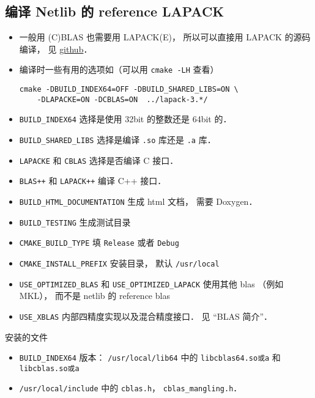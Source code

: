 \subsection{编译 Netlib 的 reference LAPACK}
\begin{itemize}
\item 一般用 (C)BLAS 也需要用 LAPACK(E)， 所以可以直接用 LAPACK 的源码编译， 见 \href{https://github.com/Reference-LAPACK/lapack/}{github}．
\item 编译时一些有用的选项如（可以用 \verb|cmake -LH| 查看）
\begin{lstlisting}[language=none]
cmake -DBUILD_INDEX64=OFF -DBUILD_SHARED_LIBS=ON \
    -DLAPACKE=ON -DCBLAS=ON  ../lapack-3.*/
\end{lstlisting}
\item \verb|BUILD_INDEX64| 选择是使用 32bit 的整数还是 64bit 的．
\item \verb|BUILD_SHARED_LIBS| 选择是编译 \verb|.so| 库还是 \verb|.a| 库．
\item \verb|LAPACKE| 和 \verb|CBLAS| 选择是否编译 C 接口．
\item \verb|BLAS++| 和 \verb|LAPACK++| 编译 C++ 接口．
\item \verb|BUILD_HTML_DOCUMENTATION| 生成 html 文档， 需要 Doxygen．
\item \verb|BUILD_TESTING| 生成测试目录
\item \verb|CMAKE_BUILD_TYPE| 填 \verb|Release| 或者 \verb|Debug|
\item \verb|CMAKE_INSTALL_PREFIX| 安装目录， 默认 \verb|/usr/local|
\item \verb|USE_OPTIMIZED_BLAS| 和 \verb|USE_OPTIMIZED_LAPACK| 使用其他 blas （例如 MKL）， 而不是 netlib 的 reference blas
\item \verb|USE_XBLAS| 内部四精度实现以及混合精度接口． 见 “BLAS 简介\upref{BLAS}”．
\end{itemize}

安装的文件
\begin{itemize}
\item \verb|BUILD_INDEX64| 版本： \verb|/usr/local/lib64| 中的 \verb|libcblas64.so或a| 和 \verb|libcblas.so或a|
\item \verb|/usr/local/include| 中的 \verb|cblas.h|， \verb|cblas_mangling.h|．
\end{itemize}
